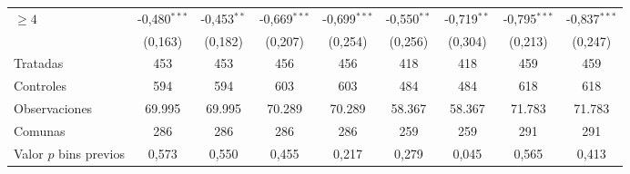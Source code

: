 \begin{tabular}{lcccccccc}
$\geq 4$ & -0{,}480$^{***}$ & -0{,}453$^{**}$ & -0{,}669$^{***}$ & -0{,}699$^{***}$ & -0{,}550$^{**}$ & -0{,}719$^{**}$ & -0{,}795$^{***}$ & -0{,}837$^{***}$ \\
 & (0{,}163) & (0{,}182) & (0{,}207) & (0{,}254) & (0{,}256) & (0{,}304) & (0{,}213) & (0{,}247) \\
\midrule
Tratadas & 453 & 453 & 456 & 456 & 418 & 418 & 459 & 459 \\
Controles & 594 & 594 & 603 & 603 & 484 & 484 & 618 & 618 \\
Observaciones & 69.995 & 69.995 & 70.289 & 70.289 & 58.367 & 58.367 & 71.783 & 71.783 \\
Comunas & 286 & 286 & 286 & 286 & 259 & 259 & 291 & 291 \\
Valor $p$ bins previos & 0{,}573 & 0{,}550 & 0{,}455 & 0{,}217 & 0{,}279 & 0{,}045 & 0{,}565 & 0{,}413 \\
\bottomrule
\end{tabular}
